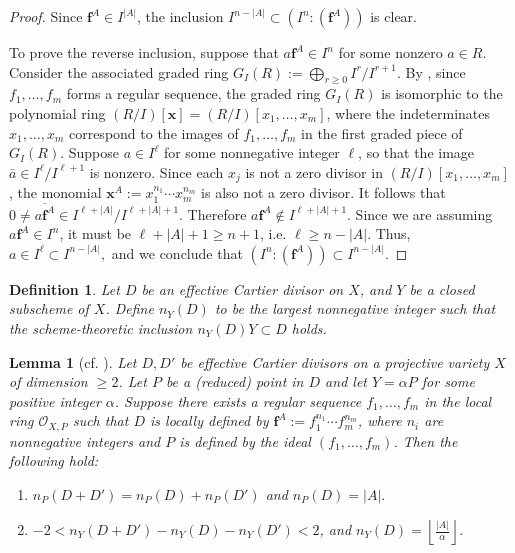 \documentclass[10pt]{amsart}
\numberwithin{equation}{section}
\theoremstyle{plain}
\newtheorem{lemma}[theorem]{Lemma}
\newtheorem{definition}[theorem]{Definition}
\theoremstyle{definition}
\begin{document}
\begin{proof}
Since $\mathbf{f}^A \in I^{|A|}$, the inclusion $I^{n-|A|} \subset (I^n:(\mathbf{f}^A))$ is clear. 

To prove the reverse inclusion, suppose that $a\mathbf{f}^A   \in I^n$ for some nonzero $a\in R$. Consider the associated graded ring $G_I(R) := \bigoplus_{r \ge 0} I^r / I^{r+1}$. By \cite[Theorem 27]{Mat80}, since $f_1,\ldots, f_m$ forms a regular sequence, the graded ring $G_I(R)$ is isomorphic to the polynomial ring $(R/I)[\mathbf{x}]=(R/I)[x_1,\ldots, x_m]$, where the indeterminates $x_1,\ldots, x_m$ correspond to the images of $f_1,\ldots, f_m$ in the first graded piece of $G_I(R)$.
Suppose $a \in I^\ell $  for some nonnegative integer $\ell$, so that the image $  \bar{a} \in I^\ell / I^{\ell+1}$ is nonzero. Since each $x_j$ is not a zero divisor in $(R/I)[x_1,\ldots, x_m]$,  the monomial $\mathbf{x}^A:=x_1^{n_1}\cdots x_m^{n_m} $ is also not a zero divisor. It follows that
$0 \neq \overline{a \mathbf{f}^A} \in I^{\ell + | A|} / I^{\ell + | A| + 1}$. Therefore $a \mathbf{f}^A \notin  I^{\ell + |A| + 1}$.  Since we are assuming $a\mathbf{f}^A   \in I^n$, it must be  $\ell + |A| + 1 \ge n+1$, i.e. $\ell \ge n - | A|$.   Thus, $a\in I^\ell \subset I^{n - | A|},$ and we conclude that $(I^n:(\mathbf{f}^A))\subset I^{n-|A|}.$
\end{proof} 
\begin{definition}
Let $D$ be an  effective Cartier divisor on $X$,  and $Y$ be a closed subscheme  of $X$.  Define $n_Y(D)$ to be the largest nonnegative integer such that the scheme-theoretic inclusion $n_Y(D) Y\subset D$ holds.
\end{definition}

\begin{lemma}[cf. {\cite[Lemma 2.17]{HLX}}]\label{orderlemma}
Let $D,D'$ be effective Cartier divisors on a projective variety $X$ of dimension $\geq 2$.
Let $P$ be a (reduced) point in $D$  and let $Y=\alpha P$ for some positive integer $\alpha$. Suppose there exists a regular sequence $f_1,\ldots, f_m$ in the local ring  $\mathcal{O}_{X,P}$  such that $D$ is locally defined by  $\mathbf{f}^A:=f_1^{n_1}\cdots f_m^{n_m}$, where $n_i$ are nonnegative integers and $P$ is defined by the ideal $(f_1,\ldots,f_m)$. Then the following hold:
\begin{enumerate}
\item[{\rm(i)}] $n_P(D + D')=n_P(D) + n_P(D')$ and  $n_P(D) = |A|.$
\item[{\rm(ii)}]  $-2<n_Y(D + D')- n_Y(D) - n_Y(D')<2 $, and $ n_Y(D) =\left\lfloor \frac{|A|}{\alpha} \right\rfloor.$
\end{enumerate}
\end{lemma}
   
\end{document}
